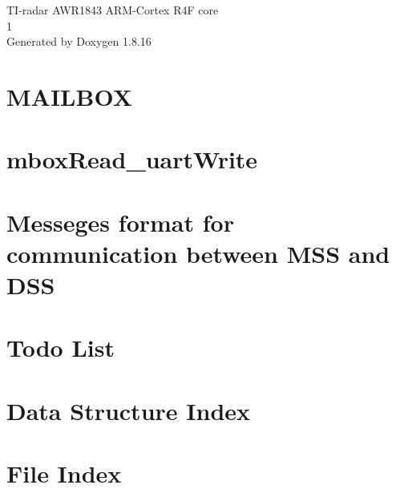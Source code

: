\let\mypdfximage\pdfximage\def\pdfximage{\immediate\mypdfximage}\documentclass[twoside]{book}
\newcommand{\+}{\discretionary{\mbox{\scriptsize$\hookleftarrow$}}{}{}}
\newcommand{\clearemptydoublepage}{%
  \newpage{\pagestyle{empty}\cleardoublepage}%
}
\begin{document}
\begin{titlepage}
\vspace*{7cm}
\begin{center}%
{\Large T\+I-\/radar A\+W\+R1843 A\+R\+M-\/\+Cortex R4F core \\[1ex]\large 1 }\\
\vspace*{1cm}
{\large Generated by Doxygen 1.8.16}\\
\end{center}
\end{titlepage}
\clearemptydoublepage
{}
\tableofcontents
\clearemptydoublepage
{}

\chapter{M\+A\+I\+L\+B\+OX}
\label{md__m_d_files_mailbox}

\chapter{mbox\+Read\+\_\+uart\+Write}
\label{md__m_d_files_mbox_read_uart_write}

\chapter{Messeges format for communication between M\+SS and D\+SS}
\label{md__m_d_files_msgs_formating}

\chapter{Todo List}
\label{todo}

\chapter{Data Structure Index}

\chapter{File Index}

\end{document}
